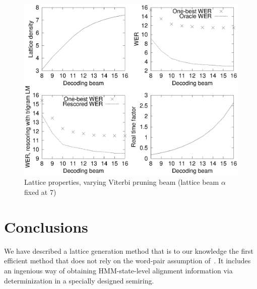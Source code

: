 \documentclass{article}
\begin{document}
\begin{figure}[t]
\centering
   \includegraphics[width=0.9\columnwidth]{figures/decodebeam.eps} 
 \vspace*{-0.1in}
    \caption{ {Lattice properties, varying Viterbi pruning beam (lattice beam $\alpha$ fixed at 7)}}
  \label{fig:viterbibeam}
  \vspace{-0.15in}
\end{figure}


\vspace*{-0.1in}
\section{Conclusions}
\label{sec:conc}
\vspace*{-0.075in}

We have described a lattice generation method that is to our knowledge the first
efficient method that does not rely on the word-pair assumption of~\cite{ney_word_graph}.
It includes an ingenious way of obtaining HMM-state-level alignment information
via determinization in a specially designed semiring. 

\vspace*{-0.04in}
\footnotesize {
\vspace*{-0.1in}


}
\end{document}
